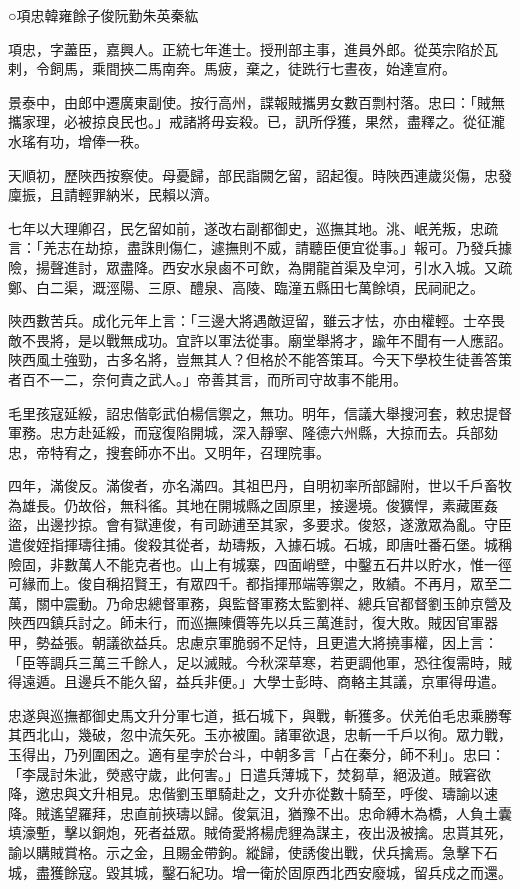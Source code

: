 
\begin{pinyinscope}
○項忠韓雍餘子俊阮勤朱英秦紘

項忠，字藎臣，嘉興人。正統七年進士。授刑部主事，進員外郎。從英宗陷於瓦剌，令飼馬，乘間挾二馬南奔。馬疲，棄之，徒跣行七晝夜，始達宣府。

景泰中，由郎中遷廣東副使。按行高州，諜報賊攜男女數百剽村落。忠曰：「賊無攜家理，必被掠良民也。」戒諸將毋妄殺。已，訊所俘獲，果然，盡釋之。從征瀧水瑤有功，增俸一秩。

天順初，歷陜西按察使。母憂歸，部民詣闕乞留，詔起復。時陜西連歲災傷，忠發廩振，且請輕罪納米，民賴以濟。

七年以大理卿召，民乞留如前，遂改右副都御史，巡撫其地。洮、岷羌叛，忠疏言：「羌志在劫掠，盡誅則傷仁，遽撫則不威，請聽臣便宜從事。」報可。乃發兵據險，揚聲進討，眾盡降。西安水泉鹵不可飲，為開龍首渠及皁河，引水入城。又疏鄭、白二渠，溉涇陽、三原、醴泉、高陵、臨潼五縣田七萬餘頃，民祠祀之。

陜西數苦兵。成化元年上言：「三邊大將遇敵逗留，雖云才怯，亦由權輕。士卒畏敵不畏將，是以戰無成功。宜許以軍法從事。廟堂舉將才，踰年不聞有一人應詔。陜西風土強勁，古多名將，豈無其人？但格於不能答策耳。今天下學校生徒善答策者百不一二，奈何責之武人。」帝善其言，而所司守故事不能用。

毛里孩寇延綏，詔忠偕彰武伯楊信禦之，無功。明年，信議大舉搜河套，敕忠提督軍務。忠方赴延綏，而寇復陷開城，深入靜寧、隆德六州縣，大掠而去。兵部劾忠，帝特宥之，搜套師亦不出。又明年，召理院事。

四年，滿俊反。滿俊者，亦名滿四。其祖巴丹，自明初率所部歸附，世以千戶畜牧為雄長。仍故俗，無科徭。其地在開城縣之固原里，接邊境。俊獷悍，素藏匿姦盜，出邊抄掠。會有獄連俊，有司跡逋至其家，多要求。俊怒，遂激眾為亂。守臣遣俊姪指揮璹往捕。俊殺其從者，劫璹叛，入據石城。石城，即唐吐番石堡。城稱險固，非數萬人不能克者也。山上有城寨，四面峭壁，中鑿五石井以貯水，惟一徑可緣而上。俊自稱招賢王，有眾四千。都指揮邢端等禦之，敗績。不再月，眾至二萬，關中震動。乃命忠總督軍務，與監督軍務太監劉祥、總兵官都督劉玉帥京營及陜西四鎮兵討之。師未行，而巡撫陳價等先以兵三萬進討，復大敗。賊因官軍器甲，勢益張。朝議欲益兵。忠慮京軍脆弱不足恃，且更遣大將撓事權，因上言：「臣等調兵三萬三千餘人，足以滅賊。今秋深草寒，若更調他軍，恐往復需時，賊得遠遁。且邊兵不能久留，益兵非便。」大學士彭時、商輅主其議，京軍得毋遣。

忠遂與巡撫都御史馬文升分軍七道，抵石城下，與戰，斬獲多。伏羌伯毛忠乘勝奪其西北山，幾破，忽中流矢死。玉亦被圍。諸軍欲退，忠斬一千戶以徇。眾力戰，玉得出，乃列圍困之。適有星孛於台斗，中朝多言「占在秦分，師不利」。忠曰：「李晟討朱泚，熒惑守歲，此何害。」日遣兵薄城下，焚芻草，絕汲道。賊窘欲降，邀忠與文升相見。忠偕劉玉單騎赴之，文升亦從數十騎至，呼俊、璹諭以速降。賊遙望羅拜，忠直前挾璹以歸。俊氣沮，猶豫不出。忠命縛木為橋，人負土囊填濠塹，擊以銅炮，死者益眾。賊倚愛將楊虎貍為謀主，夜出汲被擒。忠貰其死，諭以購賊賞格。示之金，且賜金帶鉤。縱歸，使誘俊出戰，伏兵擒焉。急擊下石城，盡獲餘寇。毀其城，鑿石紀功。增一衛於固原西北西安廢城，留兵戍之而還。


\end{pinyinscope}
